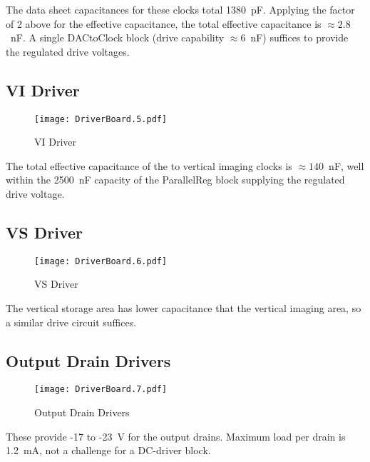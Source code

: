 The data sheet capacitances for these clocks total 1380\ pF. Applying the factor of 2 above for the effective capacitance, the total effective capacitance is $\approx 2.8$\ nF. A single DACtoClock block (drive capability $\approx 6$\ nF) suffices to provide the regulated drive voltages.
  


\subsection{VI Driver}
   \begin{figure}
   \begin{center}
   \texttt{[image: DriverBoard.5.pdf]}
   \end{center}
   \caption{VI Driver}
   \end{figure}

The total effective capacitance of the to vertical imaging clocks is $\approx 140$\ nF, well within the 2500\ nF capacity of the ParallelReg block supplying the regulated drive voltage.


\subsection{VS Driver}
   \begin{figure}
   \begin{center}
   \texttt{[image: DriverBoard.6.pdf]}
   \end{center}
   \caption{VS Driver}
   \end{figure}

The vertical storage area has lower capacitance that the vertical imaging area, so a similar drive circuit suffices.


\subsection{Output Drain Drivers}
   \begin{figure}
   \begin{center}
   \texttt{[image: DriverBoard.7.pdf]}
   \end{center}
   \caption{Output Drain Drivers}
   \end{figure}

These provide -17 to -23\ V for the output drains. Maximum load per drain is 1.2\ mA, not a challenge for a DC-driver block.  


